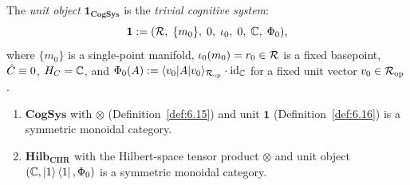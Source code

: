 \begin{definition}
\label{def:6.16}
The \emph{unit object} $\mathbf{1}_{\mathbf{CogSys}}$ is the
\emph{trivial cognitive system}:
\[
  \mathbf{1} :=
  (\mathcal{R},\; \{m_0\},\; 0,\; \iota_0,\; 0,\; \mathbb{C},\;
  \Phi_0),
\]
where $\{m_0\}$ is a single-point manifold,
$\iota_0(m_0) = r_0 \in \mathcal{R}$ is a fixed basepoint,
$\hat{C} \equiv 0$, $H_C = \mathbb{C}$, and
$\Phi_0(A) := \langle v_0 | A | v_0\rangle_{\mathcal{R}_{\mathrm{op}}} \cdot
\mathrm{id}_{\mathbb{C}}$ for a fixed unit vector
$v_0 \in \mathcal{R}_{\mathrm{op}}$.
\end{definition}

\begin{theorem}
\label{thm:6.7}
\begin{enumerate}
  \item[\textup{(i)}] $\mathbf{CogSys}$ with $\otimes$
    \textup{(}Definition~\textup{\ref{def:6.15})} and unit
    $\mathbf{1}$ \textup{(}Definition~\textup{\ref{def:6.16})}
    is a symmetric monoidal category.
  \item[\textup{(ii)}] $\mathbf{Hilb_{CIIR}}$ with the Hilbert-space
    tensor product $\otimes$ and unit object
    $(\mathbb{C}, \ket{1}\bra{1}, \Phi_0)$ is a symmetric monoidal
    category.
\end{enumerate}
\end{theorem}

